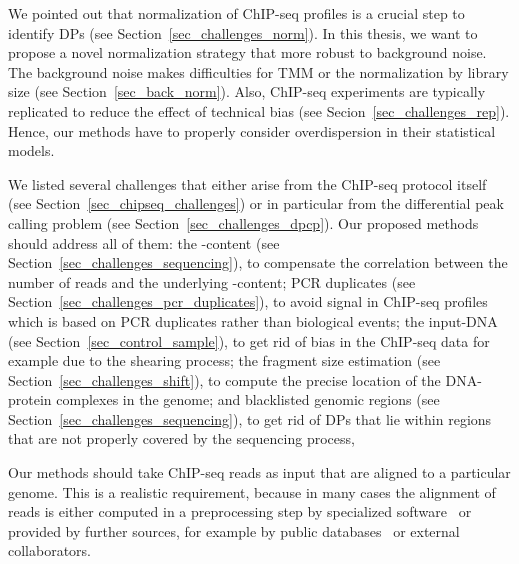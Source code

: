 We pointed out that normalization of ChIP-seq profiles is a crucial step to identify DPs (see Section~\ref{sec_challenges_norm}).
In this thesis, we want to propose a novel normalization strategy that more robust to background noise.
The background noise makes difficulties for TMM or the normalization by library size (see Section~\ref{sec_back_norm}).
Also, ChIP-seq experiments are typically replicated to reduce the effect of technical bias (see Secion~\ref{sec_challenges_rep}).
Hence, our methods have to properly consider overdispersion in their statistical models.

We listed several challenges that either arise from the ChIP-seq protocol itself (see Section~\ref{sec_chipseq_challenges}) or in particular from the differential peak calling problem (see Section~\ref{sec_challenges_dpcp}).
Our proposed methods should address all of them: 
the -content (see Section~\ref{sec_challenges_sequencing}), to compensate the correlation between the number of reads and the underlying -content;
PCR duplicates (see Section~\ref{sec_challenges_pcr_duplicates}), to avoid signal in ChIP-seq profiles which is based on PCR duplicates rather than biological events;
the input-DNA (see Section~\ref{sec_control_sample}), to get rid of bias in the ChIP-seq data for example due to the shearing process;
the fragment size estimation (see Section~\ref{sec_challenges_shift}), to compute the precise location of the DNA-protein complexes in the genome; and
blacklisted genomic regions (see Section~\ref{sec_challenges_sequencing}), to get rid of DPs that lie within regions that are not properly covered by the sequencing process,

Our methods should take ChIP-seq reads as input that are aligned to a particular genome.
This is a realistic requirement, because in many cases the alignment of reads is either computed in a preprocessing step by specialized software~\citep{li2010} or provided by further sources, for example by public databases~\citep{Edgar2002} or external collaborators.


